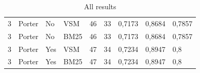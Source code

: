 \begin{table}[h]
{\begin{tabular}{lllllllll}
\rowcolor[HTML]{9B9B9B} 
3                                   & Porter                         & No                               & VSM                             & 46                               & 33                              & 0,7173                           & 0,8684                        & 0,7857                         \\
\rowcolor[HTML]{9B9B9B} 
3                                   & Porter                         & No                               & BM25                            & 46                               & 33                              & 0,7173                           & 0,8684                        & 0,7857                         \\
\rowcolor[HTML]{9B9B9B} 
3                                   & Porter                         & Yes                              & VSM                             & 47                               & 34                              & 0,7234                           & 0,8947                        & 0,8                            \\
\rowcolor[HTML]{9B9B9B} 
3                                   & Porter                         & Yes                              & BM25                            & 47                               & 34                              & 0,7234                           & 0,8947                        & 0,8                           
\end{tabular}}
\caption{All results}
\label{fig:table}
\end{table}

\FloatBarrier

